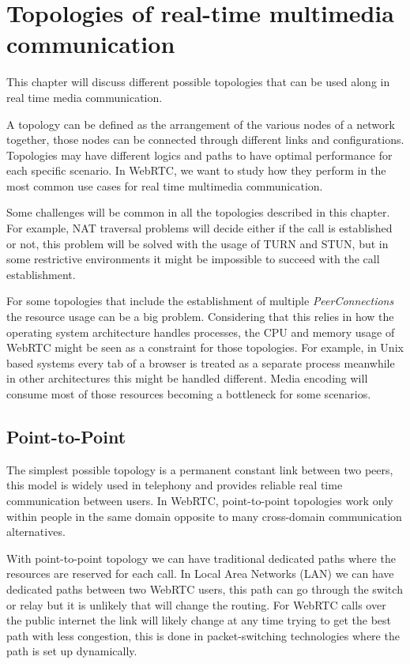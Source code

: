 \section{Topologies of real-time multimedia communication}
\label{sec:topologies}


\thispagestyle{empty}

This chapter will discuss different possible topologies that can be used along in real time media communication.

A topology can be defined as the arrangement of the various nodes of a network together, those nodes can be connected through different links and configurations. Topologies may have different logics and paths to have optimal performance for each specific scenario. In WebRTC, we want to study how they perform in the most common use cases for real time multimedia communication.

Some challenges will be common in all the topologies described in this chapter. For example, NAT traversal problems will decide either if the call is established or not, this problem will be solved with the usage of TURN and STUN, but in some restrictive environments it might be impossible to succeed with the call establishment. 

For some topologies that include the establishment of multiple {\it PeerConnections} the resource usage can be a big problem. Considering that this relies in how the operating system architecture handles processes, the CPU and memory usage of WebRTC might be seen as a constraint for those topologies. For example, in Unix based systems every tab of a browser is treated as a separate process meanwhile in other architectures this might be handled different. Media encoding will consume most of those resources becoming a bottleneck for some scenarios.
 
\subsection{Point-to-Point}

The simplest possible topology is a permanent constant link between two peers, this model is widely used in telephony and provides reliable real time communication between users. In WebRTC, point-to-point topologies work only within people in the same domain opposite to many cross-domain communication alternatives.

With point-to-point topology we can have traditional dedicated paths where the resources are reserved for each call. In Local Area Networks (LAN)  we can have dedicated paths between two WebRTC users, this path can go through the switch or relay but it is unlikely that will change the routing. For WebRTC calls over the public internet the link will likely change at any time trying to get the best path with less congestion, this is done in packet-switching technologies where the path is set up dynamically. 

